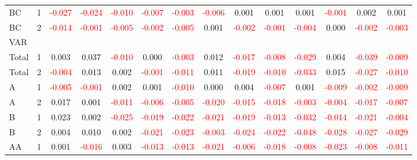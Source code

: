 \begin{table}[H]
{\begin{tabular}{llcccccccccccc}
BC & 1 & \textcolor{red}{-0.027} & \textcolor{red}{-0.024} & \textcolor{red}{-0.010} & \textcolor{red}{-0.007} & \textcolor{red}{-0.003} & \textcolor{red}{-0.006} & 0.001 & 0.001 & 0.001 & \textcolor{red}{-0.001} & 0.002 & 0.001\\
BC & 2 & \textcolor{red}{-0.014} & \textcolor{red}{-0.001} & \textcolor{red}{-0.005} & \textcolor{red}{-0.002} & \textcolor{red}{-0.005} & 0.001 & \textcolor{red}{-0.002} & \textcolor{red}{-0.001} & \textcolor{red}{-0.004} & 0.000 & \textcolor{red}{-0.002} & \textcolor{red}{-0.003}\\
\hline
VAR &  &  &  &  &  &  &  &  &  &  &  &  & \\
\hline
Total & 1 & 0.003 & 0.037 & \textcolor{red}{-0.010} & 0.000 & \textcolor{red}{-0.003} & 0.012 & \textcolor{red}{-0.017} & \textcolor{red}{-0.008} & \textcolor{red}{-0.029} & 0.004 & \textcolor{red}{-0.039} & \textcolor{red}{-0.009}\\
Total & 2 & \textcolor{red}{-0.004} & 0.013 & 0.002 & \textcolor{red}{-0.001} & \textcolor{red}{-0.011} & 0.011 & \textcolor{red}{-0.019} & \textcolor{red}{-0.010} & \textcolor{red}{-0.033} & 0.015 & \textcolor{red}{-0.027} & \textcolor{red}{-0.010}\\
A & 1 & \textcolor{red}{-0.005} & \textcolor{red}{-0.001} & 0.002 & 0.001 & \textcolor{red}{-0.010} & 0.000 & 0.004 & \textcolor{red}{-0.007} & 0.001 & \textcolor{red}{-0.009} & \textcolor{red}{-0.002} & \textcolor{red}{-0.009}\\
A & 2 & 0.017 & 0.001 & \textcolor{red}{-0.011} & \textcolor{red}{-0.006} & \textcolor{red}{-0.005} & \textcolor{red}{-0.020} & \textcolor{red}{-0.015} & \textcolor{red}{-0.018} & \textcolor{red}{-0.003} & \textcolor{red}{-0.004} & \textcolor{red}{-0.017} & \textcolor{red}{-0.007}\\
B & 1 & 0.023 & 0.002 & \textcolor{red}{-0.025} & \textcolor{red}{-0.019} & \textcolor{red}{-0.022} & \textcolor{red}{-0.021} & \textcolor{red}{-0.019} & \textcolor{red}{-0.013} & \textcolor{red}{-0.032} & \textcolor{red}{-0.014} & \textcolor{red}{-0.021} & \textcolor{red}{-0.004}\\
B & 2 & 0.004 & 0.010 & 0.002 & \textcolor{red}{-0.021} & \textcolor{red}{-0.023} & \textcolor{red}{-0.003} & \textcolor{red}{-0.024} & \textcolor{red}{-0.022} & \textcolor{red}{-0.048} & \textcolor{red}{-0.028} & \textcolor{red}{-0.027} & \textcolor{red}{-0.029}\\
AA & 1 & 0.001 & \textcolor{red}{-0.016} & 0.003 & \textcolor{red}{-0.013} & \textcolor{red}{-0.013} & \textcolor{red}{-0.021} & \textcolor{red}{-0.006} & \textcolor{red}{-0.018} & \textcolor{red}{-0.008} & \textcolor{red}{-0.023} & \textcolor{red}{-0.008} & \textcolor{red}{-0.011}\\

\end{tabular}}
\end{table}
